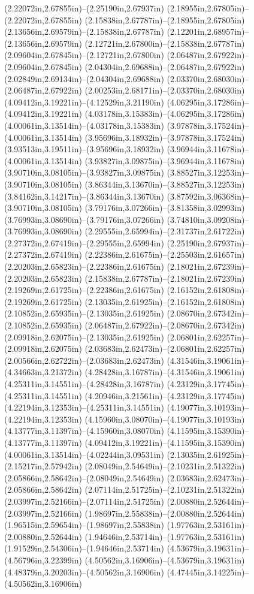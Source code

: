 (2.22072in,2.67855in)--(2.25190in,2.67937in) (2.18955in,2.67805in)--(2.22072in,2.67855in) (2.15838in,2.67787in)--(2.18955in,2.67805in) (2.13656in,2.69579in)--(2.15838in,2.67787in) (2.12201in,2.68957in)--(2.13656in,2.69579in) (2.12721in,2.67800in)--(2.15838in,2.67787in) (2.09604in,2.67845in)--(2.12721in,2.67800in) (2.06487in,2.67922in)--(2.09604in,2.67845in) (2.04304in,2.69688in)--(2.06487in,2.67922in) (2.02849in,2.69134in)--(2.04304in,2.69688in) (2.03370in,2.68030in)--(2.06487in,2.67922in) (2.00253in,2.68171in)--(2.03370in,2.68030in) (4.09412in,3.19221in)--(4.12529in,3.21190in) (4.06295in,3.17286in)--(4.09412in,3.19221in) (4.03178in,3.15383in)--(4.06295in,3.17286in) (4.00061in,3.13514in)--(4.03178in,3.15383in) (3.97878in,3.17524in)--(4.00061in,3.13514in) (3.95696in,3.18932in)--(3.97878in,3.17524in) (3.93513in,3.19511in)--(3.95696in,3.18932in) (3.96944in,3.11678in)--(4.00061in,3.13514in) (3.93827in,3.09875in)--(3.96944in,3.11678in) (3.90710in,3.08105in)--(3.93827in,3.09875in) (3.88527in,3.12253in)--(3.90710in,3.08105in) (3.86344in,3.13670in)--(3.88527in,3.12253in) (3.84162in,3.14217in)--(3.86344in,3.13670in) (3.87592in,3.06368in)--(3.90710in,3.08105in) (3.79176in,3.07266in)--(3.81358in,3.02993in) (3.76993in,3.08690in)--(3.79176in,3.07266in) (3.74810in,3.09208in)--(3.76993in,3.08690in) (2.29555in,2.65994in)--(2.31737in,2.61722in) (2.27372in,2.67419in)--(2.29555in,2.65994in) (2.25190in,2.67937in)--(2.27372in,2.67419in) (2.22386in,2.61675in)--(2.25503in,2.61657in) (2.20203in,2.65823in)--(2.22386in,2.61675in) (2.18021in,2.67239in)--(2.20203in,2.65823in) (2.15838in,2.67787in)--(2.18021in,2.67239in) (2.19269in,2.61725in)--(2.22386in,2.61675in) (2.16152in,2.61808in)--(2.19269in,2.61725in) (2.13035in,2.61925in)--(2.16152in,2.61808in) (2.10852in,2.65935in)--(2.13035in,2.61925in) (2.08670in,2.67342in)--(2.10852in,2.65935in) (2.06487in,2.67922in)--(2.08670in,2.67342in) (2.09918in,2.62075in)--(2.13035in,2.61925in) (2.06801in,2.62257in)--(2.09918in,2.62075in) (2.03683in,2.62473in)--(2.06801in,2.62257in) (2.00566in,2.62722in)--(2.03683in,2.62473in) (4.31546in,3.19061in)--(4.34663in,3.21372in) (4.28428in,3.16787in)--(4.31546in,3.19061in) (4.25311in,3.14551in)--(4.28428in,3.16787in) (4.23129in,3.17745in)--(4.25311in,3.14551in) (4.20946in,3.21561in)--(4.23129in,3.17745in) (4.22194in,3.12353in)--(4.25311in,3.14551in) (4.19077in,3.10193in)--(4.22194in,3.12353in) (4.15960in,3.08070in)--(4.19077in,3.10193in) (4.13777in,3.11397in)--(4.15960in,3.08070in) (4.11595in,3.15390in)--(4.13777in,3.11397in) (4.09412in,3.19221in)--(4.11595in,3.15390in) (4.00061in,3.13514in)--(4.02244in,3.09531in) (2.13035in,2.61925in)--(2.15217in,2.57942in) (2.08049in,2.54649in)--(2.10231in,2.51322in) (2.05866in,2.58642in)--(2.08049in,2.54649in) (2.03683in,2.62473in)--(2.05866in,2.58642in) (2.07114in,2.51725in)--(2.10231in,2.51322in) (2.03997in,2.52166in)--(2.07114in,2.51725in) (2.00880in,2.52644in)--(2.03997in,2.52166in) (1.98697in,2.55838in)--(2.00880in,2.52644in) (1.96515in,2.59654in)--(1.98697in,2.55838in) (1.97763in,2.53161in)--(2.00880in,2.52644in) (1.94646in,2.53714in)--(1.97763in,2.53161in) (1.91529in,2.54306in)--(1.94646in,2.53714in) (4.53679in,3.19631in)--(4.56796in,3.22399in) (4.50562in,3.16906in)--(4.53679in,3.19631in) (4.48379in,3.20203in)--(4.50562in,3.16906in) (4.47445in,3.14225in)--(4.50562in,3.16906in) 